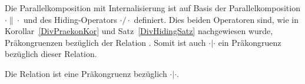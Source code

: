 Die Parallelkomposition mit Internalisierung ist auf Basis der
Parallelkomposition $\cdot \|\cdot$ und des Hiding-Operators $\cdot /\cdot$
definiert. Dies beiden Operatoren sind, wie in Korollar~\ref{DivPraekonKor} und
Satz~\ref{DivHidingSatz} nachgewiesen wurde, Präkongruenzen bezüglich der
Relation \DRel{}. Somit ist auch $\cdot |\cdot$ ein Präkongruenz bezüglich
dieser Relation.

\begin{Kor}
  Die Relation \DRel{} ist eine Präkongruenz bezüglich $\cdot |\cdot$.
\end{Kor}
